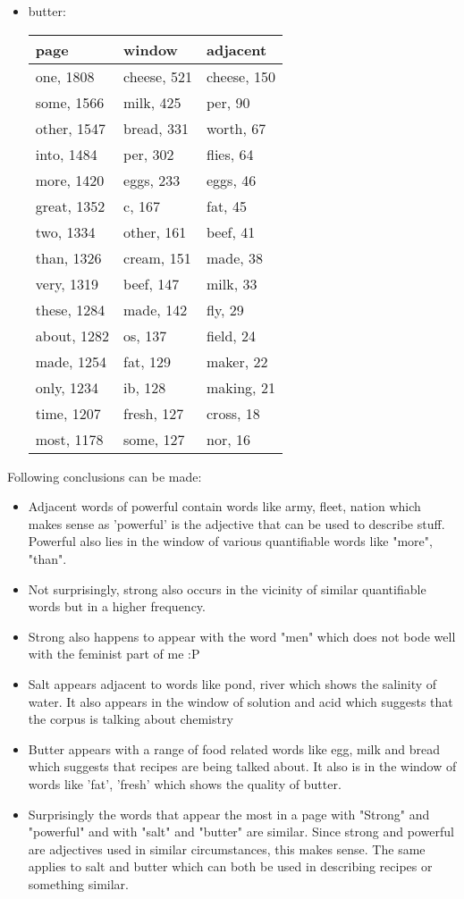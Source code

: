 \documentclass[12pt,letterpaper]{article}
\begin{document}
\begin{itemize}
\item butter:
\\
\begin{tabular}{| p{5cm} | p{5cm} | p{5cm} |}
    \hline 
    page & window & adjacent \\ \hline
    one, 1808 & cheese, 521 & cheese, 150 \\
    some, 1566 & milk, 425 & per, 90 \\
    other, 1547 & bread, 331 & worth, 67 \\
    into, 1484 & per, 302 & flies, 64 \\
    more, 1420 & eggs, 233 & eggs, 46 \\
    great, 1352 & c, 167 & fat, 45 \\
    two, 1334 & other, 161 & beef, 41 \\
    than, 1326 & cream, 151 & made, 38 \\
    very, 1319 & beef, 147 & milk, 33 \\
    these, 1284 & made, 142 & fly, 29 \\
    about, 1282 & os, 137 & field, 24 \\
    made, 1254 & fat, 129 & maker, 22 \\
    only, 1234 & ib, 128 & making, 21 \\
    time, 1207 & fresh, 127 & cross, 18 \\
    most, 1178 & some, 127 & nor, 16 \\
    \hline
\end{tabular}
\end{itemize}

Following conclusions can be made:
\begin{itemize}
\item Adjacent words of powerful contain words like army, fleet, nation which makes sense as 'powerful' is the adjective that can be used to describe stuff. Powerful also lies in the window of various quantifiable words like "more", "than". 
\item Not surprisingly, strong also occurs in the vicinity of similar quantifiable words but in a higher frequency.
\item Strong also happens to appear with the word "men" which does not bode well with the feminist part of me :P
\item Salt appears adjacent to words like pond, river which shows the salinity of water. It also appears in the window of solution and acid which suggests that the corpus is talking about chemistry
\item Butter appears with a range of food related words like egg, milk and bread which suggests that recipes are being talked about. It also is in the window of words like 'fat', 'fresh' which shows the quality of butter.
\item Surprisingly the words that appear the most in a page with "Strong" and "powerful" and with "salt" and "butter" are similar. Since strong and powerful are adjectives used in similar circumstances, this makes sense. The same applies to salt and butter which can both be used in describing recipes or something similar.
\end{itemize}
\end{document}
